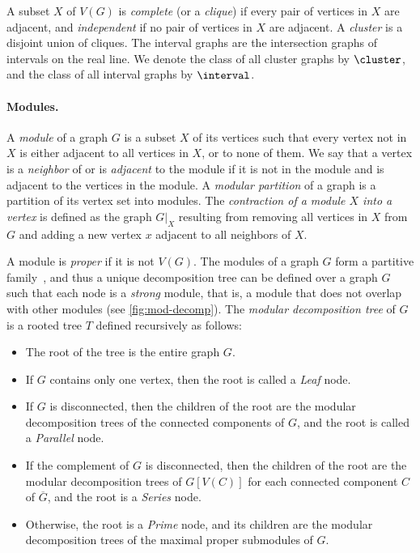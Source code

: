 \documentclass[11pt]{article}
\theoremstyle{plain}
\theoremstyle{definition}
\theoremstyle{remark}
\newcommand{\contract}[2]{#1|_{#2}}
\begin{document}
A subset $X$ of $V(G)$ is \emph{complete} (or a \emph{clique}) if every pair of vertices in $X$ are adjacent, and \emph{independent} if no pair of vertices in $X$ are adjacent. A \emph{cluster} is a disjoint union of cliques. The interval graphs are the intersection graphs of intervals on the real line. We denote the class of all cluster graphs by $\cluster$, and the class of all interval graphs by $\interval$.

\paragraph{Modules.} A \emph{module} of a graph $G$ is a subset $X$ of its vertices such that every vertex not in $X$ is either adjacent to all vertices in $X$, or to none of them. We say that a vertex is a \emph{neighbor} of or is \emph{adjacent} to the module if it is not in the module and is adjacent to the vertices in the module.
A \emph{modular partition} of a graph is a partition of its vertex set into modules. The \textit{contraction of a module $X$ into a vertex} is defined as the graph $\contract{G}{X}$ resulting from removing all vertices in $X$ from $G$ and adding a new vertex $x$ adjacent to all neighbors of $X$.

A module is \emph{proper} if it is not $V(G)$. 
The modules of a graph $G$ form a partitive family~\citep{modular-decomposition-partitive}, and thus a unique decomposition tree can be defined over a graph $G$ such that each node is a \emph{strong} module, that is, a module that does not overlap with other modules (see \cref{fig:mod-decomp}). The \emph{modular decomposition tree} of $G$ is a rooted tree $T$ defined recursively as follows:
\begin{itemize}
    \item The root of the tree is the entire graph $G$.
    \item If $G$ contains only one vertex, then the root is called a \emph{Leaf} node.
    \item If $G$ is disconnected, then the children of the root are the modular decomposition trees of the connected components of $G$, and the root is called a \emph{Parallel} node.
    \item If the complement of $G$ is disconnected, then the children of the root are the modular decomposition trees of $G[V(C)]$ for each connected component $C$ of $\overline{G}$, and the root is a \emph{Series} node.
    \item Otherwise, the root is a \emph{Prime} node, and its children are the modular decomposition trees of the maximal proper submodules of $G$.
\end{itemize}
\end{document}
